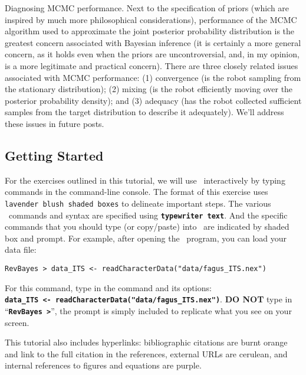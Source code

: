 \documentclass[11pt]{article}
\newcommand{\cl}[1]{{\texttt{\textbf{#1}}}}
\begin{document}
\begin{enumerate}
Diagnosing MCMC performance. Next to the specification of priors (which are inspired by much more philosophical considerations), performance of the MCMC algorithm used to approximate the joint posterior probability distribution is the greatest concern associated with Bayesian inference (it is certainly a more general concern, as it holds even when the priors are uncontroversial, and, in my opinion, is a more legitimate and practical concern). There are three closely related issues associated with MCMC performance: (1) convergence (is the robot sampling from the stationary distribution); (2) mixing (is the robot efficiently moving over the posterior probability density); and (3) adequacy (has the robot collected sufficient samples from the target distribution to describe it adequately). We’ll address these issues in future posts.

\end{enumerate}


\bigskip
\subsection{Getting Started}

For the exercises outlined in this tutorial, we will use \RevBayes~interactively by typing commands in the command-line console.
The format of this exercise uses \colorbox{shadecolor}{\tt lavender blush shaded boxes} to delineate important steps. 
The various \RevBayes~commands and syntax are specified using \cl{typewriter text}. 
And the specific commands that you should type (or copy/paste) into \RevBayes~are indicated by shaded box and prompt. 
For example, after opening the \RevBayes~program, you can load your data file:

{\tt \begin{snugshade*}
\begin{lstlisting}
RevBayes > data_ITS <- readCharacterData("data/fagus_ITS.nex")
\end{lstlisting}
\end{snugshade*}}

For this command, type in the command and its options:\\ \cl{data\_ITS <- readCharacterData("data/fagus\_ITS.nex")}. 
\textbf{DO NOT} type in ``\cl{RevBayes >}'', the prompt is simply included to replicate what you see on your screen. 

This tutorial also includes hyperlinks: bibliographic citations are {\textcolor{citescol}{burnt orange}} and link to the full citation in the references, external URLs are {\textcolor{urlscol}{cerulean}}, and internal references to figures and equations are {\textcolor{linkscol}{purple}}.
\end{document}
